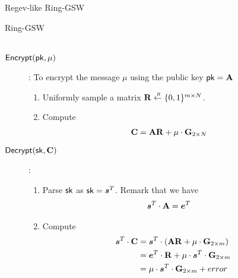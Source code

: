 \begin{subsection}{Regev-like Ring-GSW}
\begin{paragraph}{Ring-GSW}
\begin{description}
\begin{enumerate}
\begin{align*}
        \end{align*}
      \end{enumerate}
    \item[${\mathsf{Encrypt}}(\mathsf{pk}, \mu)$]: To encrypt the message $\mu$ using the public key $\mathsf{pk} = \mathbf{A}$
      \begin{enumerate}
      \item Uniformly sample a matrix $\mathbf{R} \stackrel{{\scriptscriptstyle \mkern4mu R}}{\gets} \{0,1\}^{m \times N}$.
      \item Compute
        \begin{align*}
          \mathbf{C} &= \mathbf{A} \mathbf{R} + \mu \cdot \mathbf{G}_{2\times N}
        \end{align*}
      \end{enumerate}
    \item[${\mathsf{Decrypt}}(\mathsf{sk}, \mathbf{C})$]:
      \begin{enumerate}
      \item Parse $\mathsf{sk}$ as $\sk = \vec{s}^T$. Remark that we have
        \begin{align*}
          \vec{s}^T \cdot \mat{A} &= \vec{e}^T
        \end{align*}
      \item Compute
        \begin{align*}
          \vec{s}^T \cdot \mat{C} &= \vec{s}^T \cdot (\mat{A} \mat{R} + \mu \cdot \mat{G}_{2\times m})\\
          &=\vec{e}^T \cdot \mat{R} + \mu \cdot \vec{s}^T \cdot \mat{G}_{2 \times m}\\
          &= \mu \cdot \vec{s}^T \cdot \mat{G}_{2 \times m} + error
        \end{align*}
      \end{enumerate}
    \end{description}


\end{paragraph}
\end{subsection}
